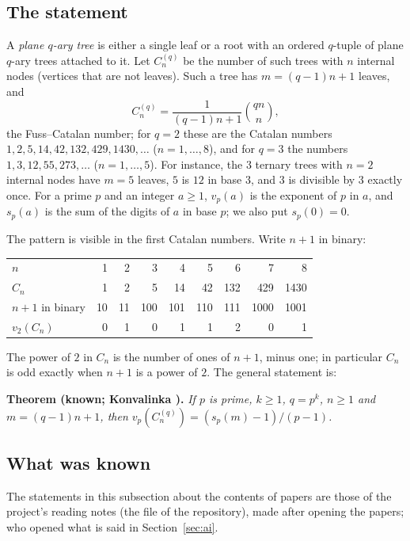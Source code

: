 \documentclass[11pt]{article}
\theoremstyle{definition}
\theoremstyle{remark}
\numberwithin{equation}{section}
\numberwithin{figure}{section}
\begin{document}
\subsection{The statement}
A \emph{plane $q$-ary tree} is either a single leaf or a root with an ordered $q$-tuple of plane $q$-ary trees
attached to it. Let $C_n^{(q)}$ be the number of such trees with $n$ internal nodes (vertices that are not
leaves). Such a tree has $m=(q-1)n+1$ leaves, and
\[
 C_n^{(q)}=\frac{1}{(q-1)n+1}\binom{qn}{n},
\]
the Fuss--Catalan number; for $q=2$ these are the Catalan numbers $1,2,5,14,42,132,429,1430,\dots$ ($n=1,\dots,8$),
and for $q=3$ the numbers $1,3,12,55,273,\dots$ ($n=1,\dots,5$). For instance, the $3$ ternary trees with $n=2$
internal nodes have $m=5$ leaves, $5$ is $12$ in base $3$, and $3$ is divisible by $3$ exactly once.
For a prime $p$ and an integer $a\ge1$, $v_p(a)$ is the exponent of $p$ in $a$, and $s_p(a)$ is the sum of the
digits of $a$ in base $p$; we also put $s_p(0)=0$.

The pattern is visible in the first Catalan numbers. Write $n+1$ in binary:
\begin{center}\small
\begin{tabular}{@{}lrrrrrrrr@{}}
\toprule
$n$ & 1 & 2 & 3 & 4 & 5 & 6 & 7 & 8\\
$C_n$ & 1 & 2 & 5 & 14 & 42 & 132 & 429 & 1430\\
$n+1$ in binary & 10 & 11 & 100 & 101 & 110 & 111 & 1000 & 1001\\
$v_2(C_n)$ & 0 & 1 & 0 & 1 & 1 & 2 & 0 & 1\\
\bottomrule
\end{tabular}
\end{center}
The power of $2$ in $C_n$ is the number of ones of $n+1$, minus one; in particular $C_n$ is odd exactly when
$n+1$ is a power of $2$. The general statement is:

\medskip\noindent\textbf{Theorem (known; Konvalinka \cite[Proposition~2]{Konvalinka}).}
\emph{If $p$ is prime, $k\ge1$, $q=p^k$, $n\ge1$ and $m=(q-1)n+1$, then $v_p(C_n^{(q)})=(s_p(m)-1)/(p-1)$.}

\subsection{What was known}\label{sec:known}
The statements in this subsection about the contents of papers are those of the project's reading notes
(the file  of the repository), made after opening the papers; who opened what is said
in Section~\ref{sec:ai}.
\end{document}
